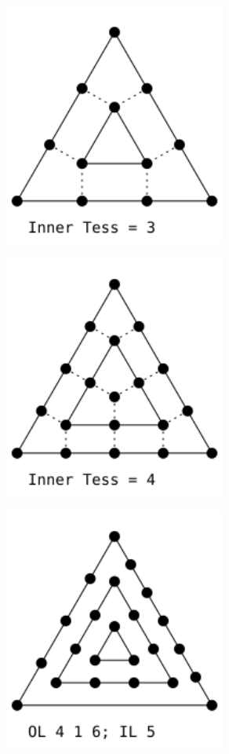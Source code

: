 \begin{figure}
	\centering
	\begin{subfigure}{0.45\textwidth}
			\includegraphics[height=8cm,width=\textwidth]{figures/TriInnerOnlyTriCorr.png}	
	\end{subfigure}
	\hfill
	\begin{subfigure}{0.45\textwidth}
			\includegraphics[height=8cm,width=\textwidth]{figures/TriInnerOnlyPointCorr.png}	
	\end{subfigure}
	\newline
	\begin{subfigure}{0.45\textwidth}
			\includegraphics[height=8cm,width=\textwidth]{figures/TriOuterAndNotris.png}	

\end{subfigure}
\end{figure}
